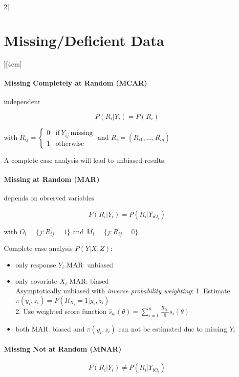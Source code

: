 \documentclass[8pt]{extarticle}
\begin{document}
\begin{multicols}{2}[\section{Missing/Deficient Data}][4cm]

\paragraph{Missing Completely at Random (MCAR)} independent 

$$P(R_i|Y_i) = P(R_i)$$

with $R_{ij} = \begin{cases} 0 & \text{if}\ Y_{ij}\ \text{missing} \\ 1 & \text{otherwise}\end{cases} $ and $R_i = (R_{i1},...,R_{iq})$

\noindent A complete case analysis will lead to unbiased results.

\paragraph{Missing at Random (MAR)} depends on observed variables

$$P(R_i|Y_i) = P(R_i|Y_{iO_i})$$

with $O_i = \{j:R_{ij}=1\}$ and $M_i = \{j:R_{ij}=0\}$

\noindent Complete case analysis $P(Y|X, Z)$:
\begin{itemize}
\item only response $Y_i$ MAR: unbiased
\item only covariate $X_i$ MAR: biased \\
Asymptotically unbiased with \textit{inverse probability weighting}:
1. Estimate $\pi(y_i,z_i) = P(R_{X_i}{=}1|y_i,z_i)$ \\
2. Use weighted score function $\hat{s}_{w}(\theta) = \sum_{i=1}^n \frac{R_{X_i}}{\hat{\pi}} s_i(\theta)$

\item both MAR: biased and $\pi(y_i,z_i)$ can not be estimated due to missing $Y_i$
\end{itemize}

\paragraph{Missing Not at Random (MNAR)}

$$P(R_i|Y_i) \neq P(R_i|Y_{iO_i})$$


\end{multicols}
\end{document}
